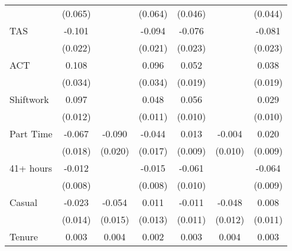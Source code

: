 {\begin{tabular}{l*{6}{c}}
                    &     (0.065)         &                     &     (0.064)         &     (0.046)         &                     &     (0.044)         \\
TAS                 &      -0.101\sym{***}&                     &      -0.094\sym{***}&      -0.076\sym{***}&                     &      -0.081\sym{***}\\
                    &     (0.022)         &                     &     (0.021)         &     (0.023)         &                     &     (0.023)         \\
ACT                 &       0.108\sym{***}&                     &       0.096\sym{***}&       0.052\sym{***}&                     &       0.038\sym{**} \\
                    &     (0.034)         &                     &     (0.034)         &     (0.019)         &                     &     (0.019)         \\
Shiftwork           &       0.097\sym{***}&                     &       0.048\sym{***}&       0.056\sym{***}&                     &       0.029\sym{***}\\
                    &     (0.012)         &                     &     (0.011)         &     (0.010)         &                     &     (0.010)         \\
Part Time           &      -0.067\sym{***}&      -0.090\sym{***}&      -0.044\sym{**} &       0.013         &      -0.004         &       0.020\sym{**} \\
                    &     (0.018)         &     (0.020)         &     (0.017)         &     (0.009)         &     (0.010)         &     (0.009)         \\
41+ hours           &      -0.012         &                     &      -0.015\sym{*}  &      -0.061\sym{***}&                     &      -0.064\sym{***}\\
                    &     (0.008)         &                     &     (0.008)         &     (0.010)         &                     &     (0.009)         \\
Casual              &      -0.023\sym{*}  &      -0.054\sym{***}&       0.011         &      -0.011         &      -0.048\sym{***}&       0.008         \\
                    &     (0.014)         &     (0.015)         &     (0.013)         &     (0.011)         &     (0.012)         &     (0.011)         \\
Tenure              &       0.003\sym{***}&       0.004\sym{***}&       0.002\sym{***}&       0.003\sym{***}&       0.004\sym{***}&       0.003\sym{***}\\

\end{tabular}}
